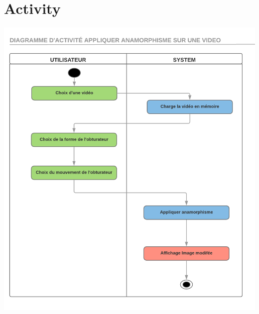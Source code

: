 \documentclass[a4paper,12pt]{report}
\begin{document}
\section{Activity}
\begin{center}
 \includegraphics[scale=0.7]{./Activites.png}
\end{center}
\end{document}
